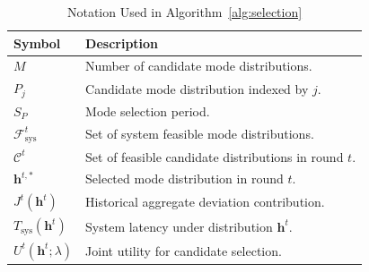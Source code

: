 \documentclass[5p,times]{elsarticle}
\theoremstyle{plain}
\theoremstyle{definition}
\theoremstyle{remark}
\begin{document}
\begin{table}[t]
\centering
\caption{Notation Used in Algorithm~\ref{alg:selection}}
\label{tab:algorithm_notation}
\small
\setlength{\tabcolsep}{4pt}
\begin{tabular}{p{}p{}}
\hline
\textbf{Symbol} & \textbf{Description} \\
\hline
$M$ & Number of candidate mode distributions. \\
$P_j$ & Candidate mode distribution indexed by $j$. \\
$S_P$ & Mode selection period. \\
$\mathcal F_{\mathrm{sys}}^t$ &
Set of system feasible mode distributions. \\
$\mathcal C^t$ &
Set of feasible candidate distributions in round $t$. \\
$\mathbf h^{t,\ast}$ &
Selected mode distribution in round $t$. \\
$J^t(\mathbf h^t)$ &
Historical aggregate deviation contribution. \\
$T_{\mathrm{sys}}(\mathbf h^t)$ &
System latency under distribution $\mathbf h^t$. \\
$U^t(\mathbf h^t;\lambda)$ &
Joint utility for candidate selection. \\
\hline
\end{tabular}
\end{table}
\end{document}
